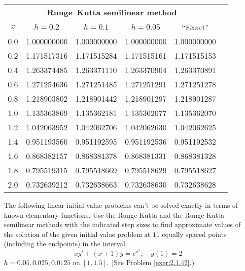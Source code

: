 \documentclass{ximera}
\begin{document}
\begin{problem}
\begin{solution}
{\small
\begin{tabular}{|c|r|r|r|r|r|}
\hline
\multicolumn{5}{|c|}{Runge--Kutta semilinear method}\\\hline
\multicolumn{1}{|c|}{$x$}&
\multicolumn{1}{|c|}{$h=0.2$}&
\multicolumn{1}{|c|}{$h=0.1$}&
\multicolumn{1}{|c|}{$h=0.05$}&
\multicolumn{1}{|c|}{``Exact"}\\ \hline
0.0 & 1.000000000 & 1.000000000 & 1.000000000 & 1.000000000 \\
0.2 & 1.171517316 & 1.171515284 & 1.171515161 & 1.171515153 \\
0.4 & 1.263374485 & 1.263371110 & 1.263370904 & 1.263370891 \\
0.6 & 1.271254636 & 1.271251485 & 1.271251291 & 1.271251278 \\
0.8 & 1.218903802 & 1.218901442 & 1.218901297 & 1.218901287 \\
1.0 & 1.135363869 & 1.135362181 & 1.135362077 & 1.135362070 \\
1.2 & 1.042063952 & 1.042062706 & 1.042062630 & 1.042062625 \\
1.4 & 0.951193560 & 0.951192595 & 0.951192536 & 0.951192532 \\
1.6 & 0.868382157 & 0.868381378 & 0.868381331 & 0.868381328 \\
1.8 & 0.795519315 & 0.795518669 & 0.795518629 & 0.795518627 \\
2.0 & 0.732639212 & 0.732638663 & 0.732638630 & 0.732638628 \\
\hline
\end{tabular}}

 \end{solution}
 \end{problem}

\begin{problem}\label{exer:3.3.19} The following linear initial value problems can't be solved exactly in terms of known elementary functions. Use the Runge-Kutta and the Runge-Kutta semilinear methods with the
indicated step sizes to find approximate values of the solution of the given initial value problem at $11$ equally spaced points (including the endpoints) in the interval.
$$xy'+(x+1)y=e^{x^2},\quad y(1)=2$$
$h=0.05,0.025,0.0125$ on $[1,1.5]$.
(See Problem \ref{exer:2.1.42}.)
\end{problem}
\end{document}
